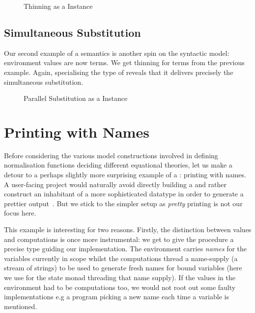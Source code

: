 \begin{figure}[h]
\caption{Thinning as a  Instance\label{fig:synren}}
\end{figure}

\subsection{Simultaneous Substitution}

Our second example of a semantics is another spin on the syntactic model:
environment values are now terms. We get thinning for terms from the
previous example. Again, specialising the type of 
reveals that it delivers precisely the simultaneous substitution.

\begin{figure}[h]
\caption{Parallel Substitution as a  Instance\label{fig:synsub}}
\end{figure}

\section{Printing with Names}
\label{prettyprint}

Before considering the various model constructions involved in defining
normalisation functions deciding different equational theories, let us
make a detour to a perhaps slightly more surprising example of a
: printing with names. A user-facing project would naturally
avoid directly building a  and rather construct an inhabitant of
a more sophisticated datatype in order to generate a prettier output~\cite{hughes1995design,wadler2003prettier}.
But we stick to the simpler setup as \emph{pretty} printing is not our focus here.

This example is interesting for two reasons. Firstly, the distinction between
values and computations is once more instrumental: we get to give the procedure
a precise type guiding our implementation. The environment carries \emph{names}
for the variables currently in scope whilst the computations thread a name-supply
(a stream of strings) to be used to generate fresh names for bound variables
(here we use  for the state monad threading that name supply).
If the values in the environment had to be computations too, we would not root
out some faulty implementations e.g a program picking a new name each time a
variable is mentioned.

